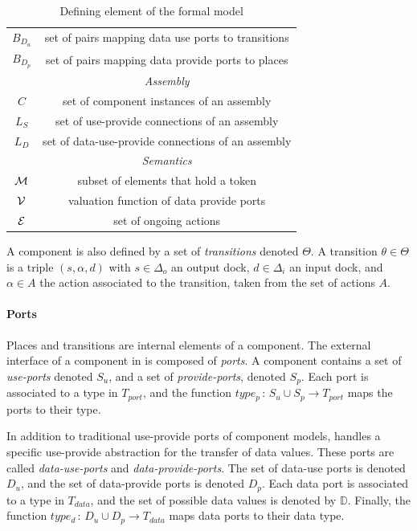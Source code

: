 {\begin{table}[tp]
{\begin{tabular}{|c|c|}
      $B_{D_{u}}$ & set of pairs mapping data use ports to transitions\\
      $B_{D_{p}}$ & set of pairs mapping data provide ports to places\\
      \hline
      \hline
      & \emph{Assembly}\\
      \hline
      $C$ & set of component instances of an assembly\\
      $L_S$ & set of use-provide connections of an assembly\\
      $L_D$ & set of data-use-provide connections of an assembly\\
      \hline
      \hline
      & \emph{Semantics}\\
      \hline
      $\mathcal{M}$ & subset of elements that hold a token\\
      $\mathcal{V}$ & valuation function of data provide ports\\
      $\mathcal{E}$ & set of ongoing actions \\
      \hline
    \end{tabular}
  }
  \caption{Defining element of the \mad formal model}
  \label{tab:not}
\end{table}
A component is also defined by a set of \emph{transitions} denoted
$\Theta$. A transition $\theta \in \Theta$ is a triple
$\left(s, \alpha, d\right)$ with $s\in\Delta_{o}$ an output dock,
$d\in\Delta_{i}$ an input dock, and $\alpha \in A$ the action
associated to the transition, taken from the set of actions $A$.
}

\paragraph{Ports}{

Places and transitions are internal elements of a \mad component.
The external interface of a component in \mad is
composed of \emph{ports}. A component contains a set of \emph{use-ports}
denoted $S_{u}$, and a set of \emph{provide-ports}, denoted
$S_{p}$. Each port is associated to a type in $T_{port}$, and the
function $type_{p}\,:\,S_{u}\cup S_{p}\rightarrow T_{port}$ maps the ports
to their type. 

In addition to traditional use-provide ports of component models,
\mad handles a specific use-provide abstraction for the
transfer of data values. These ports are called \emph{data-use-ports}
and \emph{data-provide-ports}. The set of data-use ports is denoted
$D_{u}$, and the set of data-provide ports is denoted
$D_{p}$. Each data port is associated to a type in $T_{data}$,
and the set of possible data values is denoted
by $\mathbb{D}$. Finally, the function $type_{d}\,:\,D_{u}\cup
D_{p}\rightarrow T_{data}$ maps data ports to their data type.
  
}

